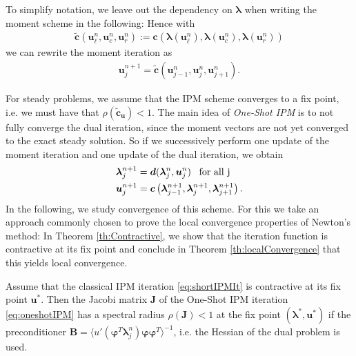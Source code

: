 To simplify notation, we leave out the dependency on $\bm{\lambda}$ when writing the moment scheme in the following: Hence with 
\begin{align*}
\bm{\tilde c}\left(\bm{u}_{\ell}^n,\bm{u}_{c}^n,\bm{u}_{r}^n\right):=\bm{c}\left(\bm{\lambda}(\bm{u}_{\ell}^n),\bm{\lambda}(\bm{u}_{c}^n),\bm{\lambda}(\bm{u}_{r}^n)\right)
\end{align*}
we can rewrite the moment iteration as
\begin{align}\label{eq:shortIPMIt}
\bm{u}_j^{n+1} = \bm{\tilde c}\left(\bm{u}_{j-1}^n,\bm{u}_{j}^n,\bm{u}_{j+1}^n\right).
\end{align}

For steady problems, we assume that the IPM scheme converges to a fix point, i.e. we must have that $\rho (\bm{\tilde c}_{\bm{u}})<1$. The main idea of \textit{One-Shot IPM} is to not fully converge the dual iteration, since the moment vectors are not yet converged to the exact steady solution. So if we successively perform one update of the moment iteration and one update of the dual iteration, we obtain 
\begin{subequations}\label{eq:oneshotIPM}
\begin{align}
&\bm{\lambda}_{j}^{n+1} =  \bm{d}(\bm{\lambda}_j^{n},\bm{u}_j^{n}) \enskip \text{ for all j} \label{eq:oneshotIPMdual}\\
&\bm{u}_j^{n+1} =  \bm{c}\left(\bm{\lambda}_{j-1}^{n+1},\bm{\lambda}_{j}^{n+1},\bm{\lambda}_{j+1}^{n+1}\right)\label{eq:oneshotIPMmoment}.
\end{align}
\end{subequations}
In the following, we study convergence of this scheme. For this we take an approach commonly chosen to prove the local convergence properties of Newton's method: In Theorem \ref{th:Contractive}, we show that the iteration function is contractive at its fix point and conclude in Theorem \ref{th:localConvergence} that this yields local convergence.
\begin{theorem}\label{th:Contractive}
Assume that the classical IPM iteration \eqref{eq:shortIPMIt} is contractive at its fix point $\bm{u}^*$. Then the Jacobi matrix $\bm{J}$ of the One-Shot IPM iteration \eqref{eq:oneshotIPM} has a spectral radius $\rho(\bm{J})<1$ at the fix point $(\bm{\lambda}^*,\bm{u}^*)$ if the preconditioner $\bm{B} = \langle u'(\bm{\varphi}^T\bm{\lambda}_j^{n})\bm{\varphi}\bm{\varphi}^T\rangle^{-1}$, i.e. the Hessian of the dual problem is used.
\end{theorem}
